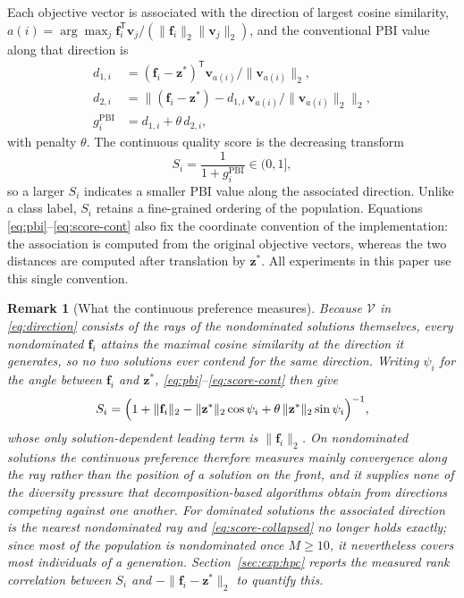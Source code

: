 \documentclass[final,5p,times,twocolumn]{elsarticle}
\newtheorem{remark}{Remark}
\newcommand{\vf}{\mathbf{f}}
\newcommand{\vv}{\mathbf{v}}
\newcommand{\vz}{\mathbf{z}}
\begin{document}
Each objective vector is associated with the direction of largest cosine
similarity, $a(i)=\arg\max_j
\vf_i^{\mathsf T}\vv_j/(\|\vf_i\|_2\|\vv_j\|_2)$, and the conventional
PBI value~\cite{ref:moead} along that direction is
\begin{equation}
\begin{aligned}
d_{1,i}&=(\vf_i-\vz^{*})^{\mathsf T}\vv_{a(i)}\big/\|\vv_{a(i)}\|_2,\\
d_{2,i}&=\bigl\|(\vf_i-\vz^{*})
        -d_{1,i}\,\vv_{a(i)}/\|\vv_{a(i)}\|_2\bigr\|_2,\\
g_i^{\mathrm{PBI}}&=d_{1,i}+\theta\,d_{2,i},
\end{aligned}
\label{eq:pbi}
\end{equation}
with penalty $\theta$. The continuous quality score is the decreasing transform
\begin{equation}
S_i=\frac{1}{1+g_i^{\mathrm{PBI}}}\in(0,1],
\label{eq:score-cont}
\end{equation}
so a larger $S_i$ indicates a smaller PBI value along the associated direction.
Unlike a class label, $S_i$ retains a fine-grained ordering of the population.
Equations \eqref{eq:pbi}--\eqref{eq:score-cont} also fix the coordinate
convention of the implementation: the association is computed from the original
objective vectors, whereas the two distances are computed after translation by
$\vz^{*}$. All experiments in this paper use this single convention.

\begin{remark}[What the continuous preference measures]
\label{rem:collapse}
Because $\mathcal{V}$ in \eqref{eq:direction} consists of the rays of the
nondominated solutions themselves, every nondominated $\vf_i$ attains the
maximal cosine similarity at the direction it generates, so no two solutions
ever contend for the same direction. Writing $\psi_i$ for the angle between
$\vf_i$ and $\vz^{*}$, \eqref{eq:pbi}--\eqref{eq:score-cont} then give
\begin{equation}
S_i=\Bigl(1+\|\vf_i\|_2-\|\vz^{*}\|_2\cos\psi_i
+\theta\,\|\vz^{*}\|_2\sin\psi_i\Bigr)^{-1},
\label{eq:score-collapsed}
\end{equation}
whose only solution-dependent leading term is $\|\vf_i\|_2$. On nondominated
solutions the continuous preference therefore measures mainly convergence along
the ray rather than the position of a solution on the front, and it supplies
none of the diversity pressure that decomposition-based algorithms obtain from
directions competing against one another. For dominated solutions the
associated direction is the nearest nondominated ray and
\eqref{eq:score-collapsed} no longer holds exactly; since most of the
population is nondominated once $M\geq10$, it nevertheless covers most
individuals of a generation. Section~\ref{sec:exp:hpc} reports the measured
rank correlation between $S_i$ and $-\|\vf_i-\vz^{*}\|_2$ to quantify this.
\end{remark}
\end{document}
